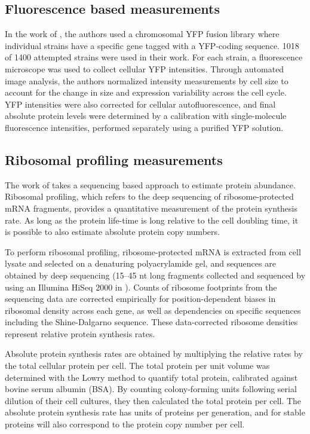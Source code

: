 \subsection{Fluorescence based measurements}
In the work of \cite{taniguchi2010}, the authors used a chromosomal YFP fusion
library where individual strains have a specific gene tagged with a YFP-coding
sequence. 1018 of 1400 attempted strains were used in their work. For each
strain, a fluorescence microscope was used to collect cellular YFP intensities.
Through automated image analysis, the authors normalized intensity measurements
by cell size to account for the change in size and expression variability across
the cell cycle. YFP intensities were also corrected for cellular
autofluorescence, and final absolute protein levels were determined by a
calibration with single-molecule fluorescence intensities, performed separately
using a purified YFP solution.

\subsection{Ribosomal profiling measurements}
The work of \cite{li2014} takes a sequencing based approach to estimate protein
abundance. Ribosomal profiling, which refers to the deep sequencing of
ribosome-protected mRNA fragments, provides a quantitative measurement of the
protein synthesis rate.  As long as the protein life-time is long relative to
the cell doubling time, it is possible to  also estimate absolute protein copy
numbers.

To perform ribosomal profiling, ribosome-protected mRNA is extracted from cell
lysate  and selected on a denaturing polyacrylamide gel, and sequences are
obtained by deep sequencing (15–45 nt long fragments collected and sequenced  by
using an Illumina HiSeq 2000 in \cite{li2014}). Counts of ribosome footprints
from the sequencing data are corrected empirically for position-dependent biases
in ribosomal density across each gene, as well as dependencies on specific
sequences including the Shine-Dalgarno sequence. These data-corrected ribosome
densities represent relative protein synthesis rates.

Absolute protein synthesis rates are obtained by multiplying the relative rates
by the total cellular protein per cell. The total protein  per unit volume  was
determined with the Lowry method to quantify total protein, calibrated against
bovine serum albumin (BSA). By counting colony-forming units following serial
dilution of their cell cultures, they then calculated the total protein per
cell. The absolute protein synthesis rate has units of  proteins per generation,
and for stable proteins will also correspond to the protein  copy number per
cell.

